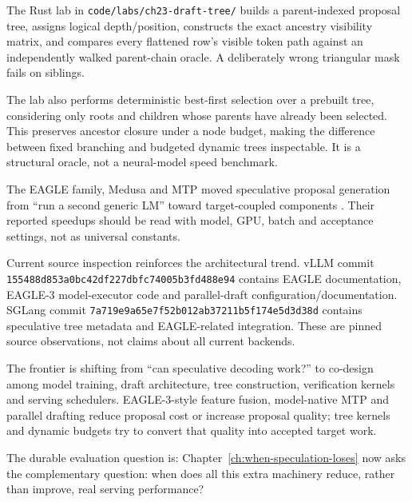 The Rust lab in \texttt{code/labs/ch23-draft-tree/} builds a parent-indexed proposal
tree, assigns logical depth/position, constructs the exact ancestry visibility matrix,
and compares every flattened row's visible token path against an independently walked
parent-chain oracle. A deliberately wrong triangular mask fails on siblings.

The lab also performs deterministic best-first selection over a prebuilt tree,
considering only roots and children whose parents have already been selected.
This preserves ancestor closure under a node budget, making
the difference between fixed branching and budgeted dynamic trees inspectable. It is a
structural oracle, not a neural-model speed benchmark.


The EAGLE family, Medusa and MTP moved speculative proposal generation from ``run a
second generic LM'' toward target-coupled components
\cite{li2024eagle,li2024eagle2,li2025eagle3,cai2024medusa,gloeckle2024mtp}.
Their reported speedups should be read with model, GPU, batch and acceptance settings,
not as universal constants.

Current source inspection reinforces the architectural trend. vLLM commit
\texttt{155488d853a0bc42df227dbfc74005b3fd488e94} contains EAGLE documentation,
EAGLE-3 model-executor code and parallel-draft configuration/documentation. SGLang
commit \texttt{7a719e9a65e7f52b012ab37211b5f174e5d3d38d} contains speculative tree metadata
and EAGLE-related integration. These are pinned source observations, not claims about
all current backends.


The frontier is shifting from ``can speculative decoding work?'' to co-design among
model training, draft architecture, tree construction, verification kernels and
serving schedulers. EAGLE-3-style feature fusion, model-native MTP and parallel drafting
reduce proposal cost or increase proposal quality; tree kernels and dynamic budgets try
to convert that quality into accepted target work.

The durable evaluation question is:
Chapter~\ref{ch:when-speculation-loses} now asks the complementary question: when does
all this extra machinery reduce, rather than improve, real serving performance?

